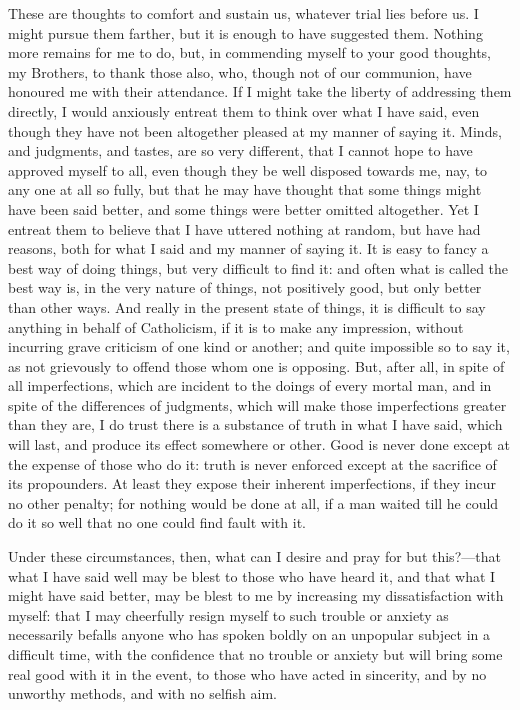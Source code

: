 These are thoughts to comfort and sustain us, whatever
trial lies before us. I might pursue them farther, but it
is enough to have suggested them. Nothing more remains
for me to do, but, in commending myself to your good
thoughts, my Brothers, to thank those also, who, though
not of our communion, have honoured me with their
attendance. If I might take the liberty of addressing
them directly, I would anxiously entreat them to think
over what I have said, even though they have not been
altogether pleased at my manner of saying it. Minds, and
judgments, and tastes, are so very different, that I
cannot hope to have approved myself to all, even though
they be well disposed towards me, nay, to any one at all
so fully, but that he may have thought that some things
might have been said better, and some things were better
omitted altogether. Yet I entreat them to believe that I
have uttered nothing at random, but have had reasons,
both for what I said and my manner of saying it. It is
easy to fancy a best way of doing things, but very
difficult to find it: and often what is called the best
way is, in the very nature of things, not positively
good, but only better than other ways. And really in the
present state of things, it is difficult to say anything
in behalf of Catholicism, if it is to make any
impression, without incurring grave criticism of one kind
or another; and quite impossible so to say it, as not
grievously to offend those whom one is opposing. But,
after all, in spite of all imperfections, which are
incident to the doings of every mortal man, and in spite
of the differences of judgments, which will make those
imperfections greater than they are, I do trust there is
a substance of truth in what I have said, which will
last, and produce its effect somewhere or other. Good is
never done except at the expense of those who do it:
truth is never enforced except at the sacrifice of its
propounders. At least they expose their inherent
imperfections, if they incur no other penalty; for
nothing would be done at all, if a man waited till he
could do it so well that no one could find fault with it.

Under these circumstances, then, what can I desire and
pray for but this?—that what I have said well may be
blest to those who have heard it, and that what I might
have said better, may be blest to me by increasing my
dissatisfaction with myself: that I may cheerfully resign
myself to such trouble or anxiety as necessarily befalls
anyone who has spoken boldly on an unpopular subject in a
difficult time, with the confidence that no trouble or
anxiety but will bring some real good with it in the
event, to those who have acted in sincerity, and by no
unworthy methods, and with no selfish aim.

